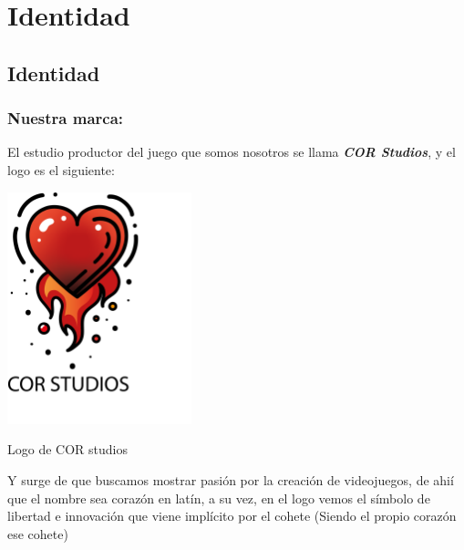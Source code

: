 \documentclass[12pt, oneside, letterpaper]{book}
\begin{document}
\part{Identidad}
\chapter{Identidad}
\section{Nuestra marca:}
\p El estudio productor del juego que somos nosotros se llama \textbf{\textit{COR Studios}}, y el logo es el siguiente: 
\begin{center}
\includegraphics[width=0.4\textwidth]{logoCOR.png}%
\caption{Logo de COR studios}%
\label{LCS}%
\end{center} 
\p Y surge de que buscamos mostrar pasión por la creación de videojuegos, de ahií que el nombre sea corazón en latín, a su vez, en el logo vemos el símbolo de libertad e innovación que viene implícito por el cohete (Siendo el propio corazón ese cohete)
\end{document}
